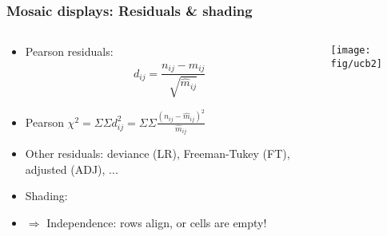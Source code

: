 \begin{frame}
  \frametitle{Mosaic displays: Residuals \& shading}
 \begin{columns}
   \begin{column}{.5\textwidth}
     \begin{itemize}
	  \item \alert{Pearson residuals}: 
		\begin{equation*}
		 d_{ij} = \frac{n_{ij} - \widehat{m}_{ij} }{\sqrt{\widehat{m}_{ij}}}
		\end{equation*}
       \item Pearson $\chi^2 = \Sigma \Sigma d_{ij}^2 =  \Sigma \Sigma \frac{(n_{ij} - \hat{m}_{ij})^2}{\hat{m}_{ij}}$
       \item Other residuals: deviance (LR), Freeman-Tukey (FT), adjusted (ADJ), ...
       \item \alert{Shading}:
       \item $\Rightarrow$ Independence:  rows align, or \alert{cells are empty}!
     \end{itemize}
   \end{column}
   \begin{column}{.5\textwidth}
      \texttt{[image: fig/ucb2]}
   \end{column}
 \end{columns}
\end{frame}

\endinput
